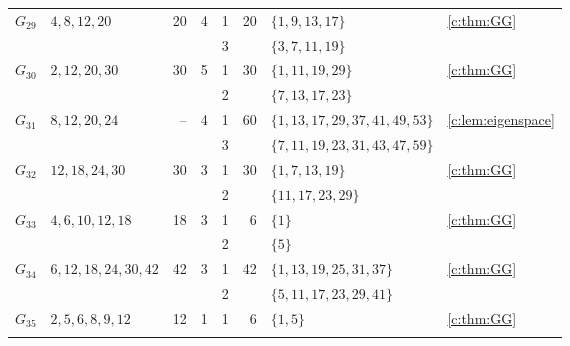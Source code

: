 \documentclass[11pt]{amsart}
\theoremstyle{definition}
\begin{document}
\begin{longtable}{@{}lL{.24\textwidth}rrrrL{.26\textwidth}L{.14\textwidth}@{}}
$G_{29}$ & $4,\allowbreak 8,\allowbreak 12,\allowbreak 20$ & 20 & 4 & 1 & 20 & $\{1,\allowbreak 9,\allowbreak 13,\allowbreak 17\}$ & \cref{c:thm:GG} \\*
 &  &  &  & 3 &  & $\{3,\allowbreak 7,\allowbreak 11,\allowbreak 19\}$ &  \\
\midrule[.25pt]
$G_{30}$ & $2,\allowbreak 12,\allowbreak 20,\allowbreak 30$ & 30 & 5 & 1 & 30 & $\{1,\allowbreak 11,\allowbreak 19,\allowbreak 29\}$ & \cref{c:thm:GG} \\*
 &  &  &  & 2 &  & $\{7,\allowbreak 13,\allowbreak 17,\allowbreak 23\}$ &  \\
\midrule[.25pt]
$G_{31}$ & $8,\allowbreak 12,\allowbreak 20,\allowbreak 24$ & -- & 4 & 1 & 60 & $\{1,\allowbreak 13,\allowbreak 17,\allowbreak 29,\allowbreak 37,\allowbreak 41,\allowbreak 49,\allowbreak 53\}$ & \cref{c:lem:eigenspace} \\*
 &  &  &  & 3 &  & $\{7,\allowbreak 11,\allowbreak 19,\allowbreak 23,\allowbreak 31,\allowbreak 43,\allowbreak 47,\allowbreak 59\}$ &  \\
\midrule[.25pt]
$G_{32}$ & $12,\allowbreak 18,\allowbreak 24,\allowbreak 30$ & 30 & 3 & 1 & 30 & $\{1,\allowbreak 7,\allowbreak 13,\allowbreak 19\}$ & \cref{c:thm:GG} \\*
 &  &  &  & 2 &  & $\{11,\allowbreak 17,\allowbreak 23,\allowbreak 29\}$ &  \\
\midrule[.25pt]
$G_{33}$ & $4,\allowbreak 6,\allowbreak 10,\allowbreak 12,\allowbreak 18$ & 18 & 3 & 1 & 6 & $\{1\}$ & \cref{c:thm:GG} \\*
 &  &  &  & 2 &  & $\{5\}$ &  \\
\midrule[.25pt]
$G_{34}$ & $6,\allowbreak 12,\allowbreak 18,\allowbreak 24,\allowbreak 30,\allowbreak 42$ & 42 & 3 & 1 & 42 & $\{1,\allowbreak 13,\allowbreak 19,\allowbreak 25,\allowbreak 31,\allowbreak 37\}$ & \cref{c:thm:GG} \\*
 &  &  &  & 2 &  & $\{5,\allowbreak 11,\allowbreak 17,\allowbreak 23,\allowbreak 29,\allowbreak 41\}$ &  \\
\midrule[.25pt]
$G_{35}$ & $2,\allowbreak 5,\allowbreak 6,\allowbreak 8,\allowbreak 9,\allowbreak 12$ & 12 & 1 & 1 & 6 & $\{1,\allowbreak 5\}$ & \cref{c:thm:GG} \\
\midrule[.25pt]

\end{longtable}
\end{document}
